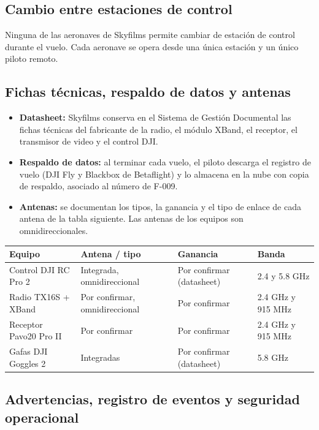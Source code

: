 \subsection{Cambio entre estaciones de control}

Ninguna de las aeronaves de Skyfilms permite cambiar de estación de control durante el vuelo. Cada aeronave se opera desde una única estación y un único piloto remoto.

\subsection{Fichas técnicas, respaldo de datos y antenas}

\begin{itemize}
\item \textbf{Datasheet:} Skyfilms conserva en el Sistema de Gestión Documental las fichas técnicas del fabricante de la radio, el módulo XBand, el receptor, el transmisor de video y el control DJI.
\item \textbf{Respaldo de datos:} al terminar cada vuelo, el piloto descarga el registro de vuelo (DJI Fly y Blackbox de Betaflight) y lo almacena en la nube con copia de respaldo, asociado al número de F-009.
\item \textbf{Antenas:} se documentan los tipos, la ganancia y el tipo de enlace de cada antena de la tabla siguiente. Las antenas de los equipos son omnidireccionales.
\end{itemize}

\renewcommand{\arraystretch}{1.3}
\begin{longtable}{|p{3.4cm}|p{3.4cm}|p{3.2cm}|p{3.7cm}|}
\hline
\rowcolor[gray]{0.9}\textbf{Equipo} & \textbf{Antena / tipo} & \textbf{Ganancia} & \textbf{Banda} \\ \hline
Control DJI RC Pro 2 & Integrada, omnidireccional & Por confirmar (datasheet) & 2.4 y 5.8 GHz \\ \hline
Radio TX16S + XBand & Por confirmar, omnidireccional & Por confirmar & 2.4 GHz y 915 MHz \\ \hline
Receptor Pavo20 Pro II & Por confirmar & Por confirmar & 2.4 GHz y 915 MHz \\ \hline
Gafas DJI Goggles 2 & Integradas & Por confirmar (datasheet) & 5.8 GHz \\ \hline
\end{longtable}

\subsection{Advertencias, registro de eventos y seguridad operacional}

